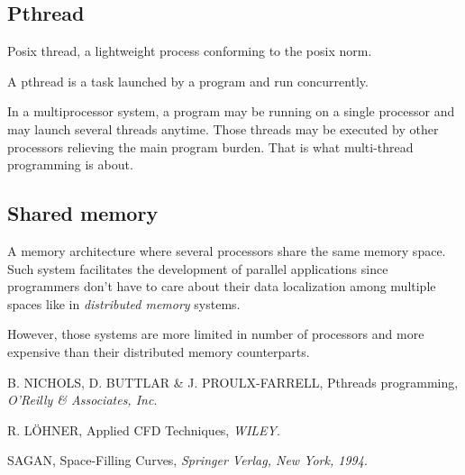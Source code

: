 \documentclass[a4paper,12pt]{article}
\begin{document}
\subsection{Pthread}
Posix thread, a lightweight process conforming to the posix norm.

A pthread is a task launched by a program and run concurrently.

In a multiprocessor system, a program may be running on a single processor and may launch several threads anytime. Those threads may be executed by other processors relieving the main program burden. That is what multi-thread programming is about.

\subsection{Shared memory}
A memory architecture where several processors share the same memory space. Such system facilitates the development of parallel applications since programmers don't have to care about their data localization among multiple spaces like in \emph{distributed memory} systems.

However, those systems are more limited in number of processors and more expensive than their distributed memory counterparts.


%
%


\begin{thebibliography}{99}
\small

	B. NICHOLS, D. BUTTLAR \& J. PROULX-FARRELL,
	Pthreads programming,
	\emph{O'Reilly \& Associates, Inc}.

	R. L\"OHNER,
	Applied CFD Techniques,
	\emph{WILEY}.

	SAGAN,
	Space-Filling Curves,
	\emph{Springer Verlag, New York, 1994}.

\end{thebibliography}
\end{document}

